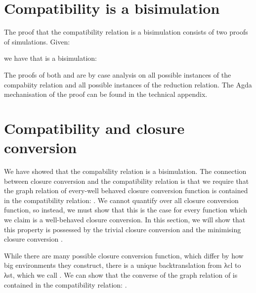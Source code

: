 \documentclass[bsc,frontabs,oneside,singlespacing,parskip,deptreport]{infthesis}
\theoremstyle{definition}
\theoremstyle{lemma}
\begin{document}
\section{Compatibility is a bisimulation}
\label{sec:comp-relat-bisim}

The proof that the compatibility relation \AS{\ti} is a bisimulation
consists of two proofs of simulations. Given:

\noindent
\begin{minipage}{.5\textwidth}
\end{minipage}%
\begin{minipage}{.5\textwidth}
\end{minipage}

we have that \AS{\ti} is a bisimulation:


The proofs of both  and  are by case analysis on
all possible instances of the compabiity relation \AS{\ti} and all
possible instances of the reduction relation. The Agda mechanisation
of the proof can be found in the technical appendix.

\section{Compatibility and closure conversion}
\label{sec:comp-relat-clos}

We have showed that the compability relation is a bisimulation. The
connection between closure conversion and the compatibility relation
is that we require that the graph relation of every-well behaved
closure conversion function  is contained in the compatibility
relation: . We cannot quantify over all closure conversion function, so
instead, we must show that this is the case for every function which
we claim is a well-behaved closure conversion. In this section, we
will show that this property is possessed by the trivial closure
conversion  and the minimising closure conversion
.

While there are many possible closure conversion function, which
differ by how big environments they construct, there is a unique
backtranslation from λcl to λst, which we call . We can show
that the converse of the graph relation of  is contained in
the compatibility relation: .

\end{document}
